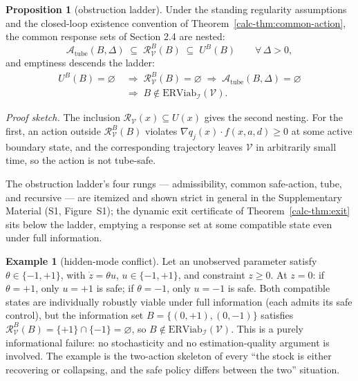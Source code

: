 \documentclass[10pt,twocolumn]{article}
\theoremstyle{definition}
\newtheorem{proposition}{Proposition}
\newtheorem{example}{Example}
\begin{document}
\begin{proposition}[obstruction ladder]\label{calc-prop:ladder}
Under the standing regularity assumptions and the closed-loop existence
convention of Theorem~\ref{calc-thm:common-action}, the common response sets
of Section 2.4 are nested:
\[\mathcal{A}_{\mathrm{tube}}(B,\Delta) \;\subseteq\; \mathcal{R}_{\mathcal{V}}^B(B) \;\subseteq\; U^B(B) \qquad \forall\,\Delta>0,\]
and emptiness descends the ladder:
\[
\begin{aligned}
U^B(B)=\varnothing \;&\Longrightarrow\; \mathcal{R}_{\mathcal{V}}^B(B)=\varnothing \;\Longrightarrow\; \mathcal{A}_{\mathrm{tube}}(B,\Delta)=\varnothing \\
&\Longrightarrow\; B\notin\mathrm{ERViab}_{\mathcal{I}}(\mathcal{V}).
\end{aligned}
\]
\end{proposition}

\emph{Proof sketch.} The inclusion \(\mathcal{R}_{\mathcal{V}}(x) \subseteq U(x)\) gives the second nesting. For the first, an action outside \(\mathcal{R}_{\mathcal{V}}^B(B)\) violates \(\nabla q_j(x) \cdot f(x, a, d) \ge 0\) at some active boundary state, and the corresponding trajectory leaves \(\mathcal{V}\) in arbitrarily small time, so the action is not tube-safe.

The obstruction ladder's four rungs --- admissibility, common safe-action, tube, and recursive --- are itemized and shown strict in general in the Supplementary Material (S1, Figure~S1); the dynamic exit certificate of Theorem~\ref{calc-thm:exit} sits below the ladder, emptying a response set at some compatible state even under full information.

\begin{example}[hidden-mode conflict]\label{calc-ex:hidden-mode} Let an unobserved parameter satisfy
\(\theta \in \{-1, +1\}\), with \(\dot z = \theta u\),
\(u \in \{-1, +1\}\), and constraint \(z \ge 0\). At \(z = 0\): if
\(\theta = +1\), only \(u = +1\) is safe; if \(\theta = -1\), only
\(u = -1\) is safe. Both compatible states are individually robustly
viable under full information (each admits its safe control), but the
information set \(B = \{(0, +1), (0, -1)\}\) satisfies
\(\mathcal{R}_{\mathcal{V}}^B(B) = \{+1\} \cap \{-1\} = \varnothing\),
so \(B \notin \mathrm{ERViab}_{\mathcal{I}}(\mathcal{V})\). This is a
purely informational failure: no stochasticity and no estimation-quality
argument is involved. The example is the two-action skeleton of every
``the stock is either recovering or collapsing, and the safe policy
differs between the two'' situation.

\end{example}
\end{document}
